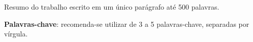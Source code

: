 \begin{resumo}
  Resumo do trabalho escrito em um único parágrafo até 500 palavras.

  \vspace{0.5cm}
  \noindent \textbf{Palavras-chave}: recomenda-se utilizar de 3 a 5 palavras-chave, separadas por vírgula.
\end{resumo}

\newpage

\begin{abstract}
  Write an abstract of your work in one paragraph.

  \vspace{0.5cm}
  \noindent \textbf{Keywords}: keyword 1, keyword 2, keyword 3.
\end{abstract}
